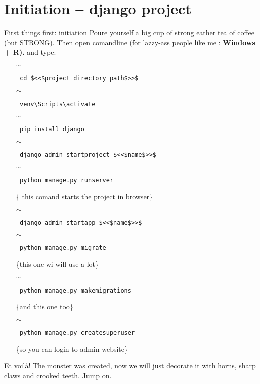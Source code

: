\documentclass[12pt,a4paper]{article}
\begin{document}
\section{Initiation -- django project}
First things first: initiation
 Poure yourself a big cup of strong eather tea of coffee (but STRONG).
Then open comandline (for lazzy-ass people like me : \textbf{\color{violet} Windows + R).} and type:\\
\begin{itemize}
\item[$\sim$] \begin{verbatim} cd $<<$project directory path$>>$\end{verbatim} 
\item[$\sim$] \begin{verbatim} venv\Scripts\activate \end{verbatim} 
\item[$\sim$] \begin{verbatim} pip install django\end{verbatim} 
\item[$\sim$] \begin{verbatim} django-admin startproject $<<$name$>>$\end{verbatim} 
\item[$\sim$] \begin{verbatim} python manage.py runserver\end{verbatim}{\color{teal}\{ this comand starts the project in browser\}}
\item[$\sim$] \begin{verbatim} django-admin startapp $<<$name$>>$\end{verbatim} 
\item[$\sim$] \begin{verbatim} python manage.py migrate\end{verbatim}{\color{teal}\{this one wi will use a lot\}}
\item[$\sim$] \begin{verbatim} python manage.py makemigrations \end{verbatim}{\color{teal}\{and this one too\}}
\item[$\sim$] \begin{verbatim} python manage.py createsuperuser \end{verbatim} {\color{teal}\{so you can login to admin website\}}
\end{itemize}
Et voilà! The monster was created, now we will just decorate it with horns, sharp claws and crooked teeth. Jump on.
\end{document}
